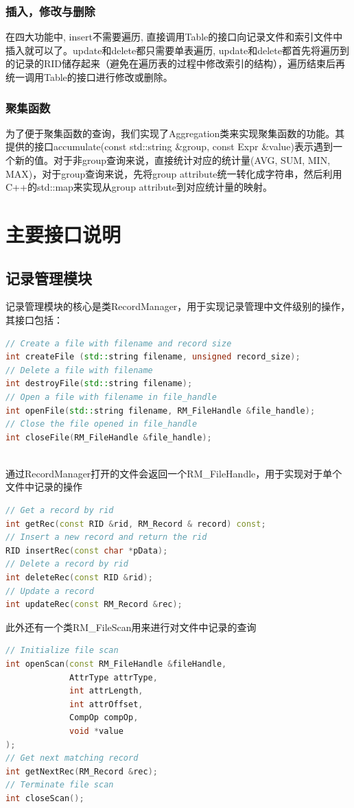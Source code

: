 \documentclass[11pt,UTF8]{report}
\begin{document}
\subsubsection{插入，修改与删除}
在四大功能中, insert不需要遍历, 直接调用Table的接口向记录文件和索引文件中插入就可以了。update和delete都只需要单表遍历, update和delete都首先将遍历到的记录的RID储存起来（避免在遍历表的过程中修改索引的结构），遍历结束后再统一调用Table的接口进行修改或删除。

\subsubsection{聚集函数}
为了便于聚集函数的查询，我们实现了Aggregation类来实现聚集函数的功能。其提供的接口accumulate(const std::string \&group, const Expr \&value)表示遇到一个新的值。对于非group查询来说，直接统计对应的统计量(AVG, SUM, MIN, MAX)，对于group查询来说，先将group attribute统一转化成字符串，然后利用C++的std::map来实现从group attribute到对应统计量的映射。

\section{主要接口说明}
\subsection{记录管理模块}
记录管理模块的核心是类RecordManager，用于实现记录管理中文件级别的操作，其接口包括：
\begin{lstlisting}[language=C++]
// Create a file with filename and record size
int createFile (std::string filename, unsigned record_size);
// Delete a file with filename
int destroyFile(std::string filename);
// Open a file with filename in file_handle
int openFile(std::string filename, RM_FileHandle &file_handle);
// Close the file opened in file_handle
int closeFile(RM_FileHandle &file_handle);
​\end{lstlisting}

通过RecordManager打开的文件会返回一个RM\_FileHandle，用于实现对于单个文件中记录的操作
\begin{lstlisting}[language=C++]
// Get a record by rid
int getRec(const RID &rid, RM_Record & record) const;
// Insert a new record and return the rid
RID insertRec(const char *pData);
// Delete a record by rid
int deleteRec(const RID &rid);
// Update a record
int updateRec(const RM_Record &rec);
\end{lstlisting}

此外还有一个类RM\_FileScan用来进行对文件中记录的查询
\begin{lstlisting}[language=C++]
// Initialize file scan
int openScan(const RM_FileHandle &fileHandle,
             AttrType attrType,
             int attrLength,
             int attrOffset,
             CompOp compOp,
             void *value
);
// Get next matching record
int getNextRec(RM_Record &rec);
// Terminate file scan
int closeScan();
\end{lstlisting}
\end{document}
